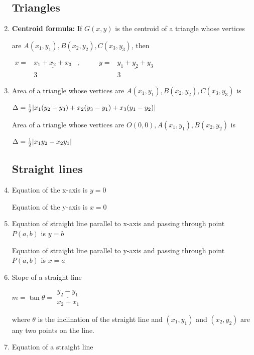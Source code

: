 \documentclass[a4paper]{article}
\begin{document}
\begin{enumerate}
\subsection{Triangles}

\item
\textbf{Centroid formula:}
If $G(x,y)$ is the centroid of a triangle whose vertices

are $A(x_1,y_1), B(x_2,y_2), C(x_3,y_3)$, then

$\begin{array}{rclrc}
x= & \underline{x_1+x_2+x_3}  &, \qquad & y=& \underline{y_1+y_2+y_3} \\
 & 3 & & & 3 
\end{array}$

\item
Area of a triangle whose vertices are $A(x_1,y_1), B(x_2,y_2), C(x_3,y_3)$ is

$\Delta = \frac{1}{2}|
x_1(y_2-y_3)+
x_2(y_3-y_1)+
x_3(y_1-y_2)|$

Area of a triangle whose vertices are $O(0,0), A(x_1,y_1), B(x_2,y_2)$ is

$\Delta = \frac{1}{2}|
x_1y_2
-x_2y_1|$

\subsection{Straight lines}

\item
Equation of the x-axis is $y=0$

Equation of the y-axis is $x=0$

\item
Equation of straight line parallel to x-axis and passing through point $P(a,b)$ is $y=b$

Equation of straight line parallel to y-axis and passing through point $P(a,b)$ is $x=a$

\item
Slope of a straight line

$m = \tan \theta = 
\begin{array}{c}
\underline{y_2-y_1} \\
x_2-x_1
\end{array}
$ 

where $\theta$ is the inclination of the straight line and $(x_1,y_1)$ and $(x_2,y_2)$ are any two points on the line.

\item
Equation of a straight line


\end{enumerate}
\end{document}
